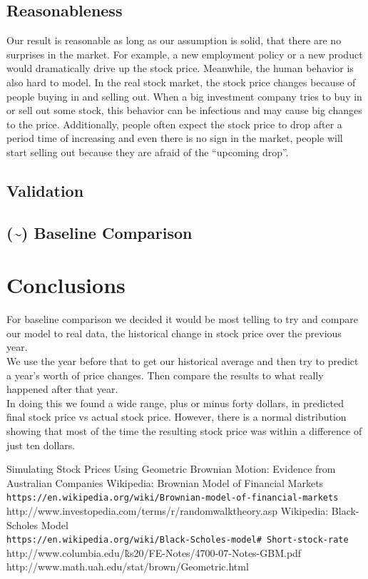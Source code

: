 \documentclass{article}
\begin{document}
\subsection{Reasonableness}
Our result is reasonable as long as our assumption is solid, that there are no surprises in the market. For example, a new employment policy or a new product would dramatically drive up the stock price.  Meanwhile, the human behavior is also hard to model. In the real stock market, the stock price changes because of people buying in and selling out. When a big investment company tries to buy in or sell out some stock, this behavior can be infectious and may cause big changes to the price. Additionally, people often expect the stock price to drop after a period time of increasing and even there is no sign in the market, people will start selling out because they are afraid of the ``upcoming drop”. 


\subsection{Validation}

\subsection{(\textasciitilde) Baseline Comparison}

\section{Conclusions}

For baseline comparison we decided it would be most telling to try and compare our model to real data, the historical change in stock price over the previous year.\\
We use the year before that to get our historical average and then try to predict a year's worth of price changes. Then compare the results to what really happened after that year.\\
In doing this we found a wide range, plus or minus forty dollars, in predicted final stock price vs actual stock price. However, there is a normal distribution showing that most of the time the resulting stock price was within a difference of just ten dollars.


\pagebreak
\begin{thebibliography}{9}
Simulating Stock Prices Using Geometric Brownian Motion: Evidence from Australian
Companies
Wikipedia: Brownian Model of Financial Markets\\
\texttt{https://en.wikipedia.org/wiki/Brownian-model-of-financial-markets}
http://www.investopedia.com/terms/r/randomwalktheory.asp
Wikipedia: Black-Scholes Model\\
\texttt{https://en.wikipedia.org/wiki/Black-Scholes-model\# Short-stock-rate}
http://www.columbia.edu/\~ ks20/FE-Notes/4700-07-Notes-GBM.pdf
http://www.math.uah.edu/stat/brown/Geometric.html
\end{thebibliography}
\end{document}
